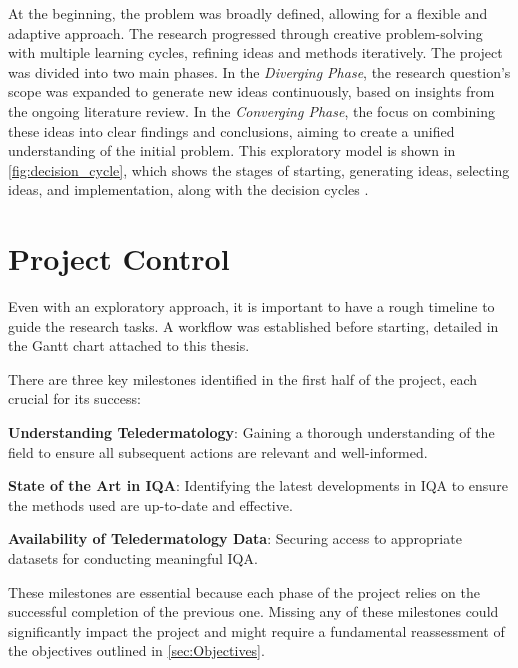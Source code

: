 \vspace{\baselineskip}
\noindent
At the beginning, the problem was broadly defined, allowing for a flexible and adaptive approach. The research progressed through creative problem-solving with multiple learning cycles, refining ideas and methods iteratively. The project was divided into two main phases. In the \textit{Diverging Phase}, the research question’s scope was expanded to generate new ideas continuously, based on insights from the ongoing literature review. In the \textit{Converging Phase}, the focus on combining these ideas into clear findings and conclusions, aiming to create a unified understanding of the initial problem. This exploratory model is shown in \autoref{fig:decision_cycle}, which shows the stages of starting, generating ideas, selecting ideas, and implementation, along with the decision cycles .

\section{Project Control}
\label{sec:ProjectMonitoring}
Even with an exploratory approach, it is important to have a rough timeline to guide the research tasks. A workflow was established before starting, detailed in the Gantt chart attached to this thesis. \par
\vspace{\baselineskip}
\noindent
There are three key milestones identified in the first half of the project, each crucial for its success: \par
\vspace{\baselineskip}
\noindent
\textbf{Understanding Teledermatology}: Gaining a thorough understanding of the field to ensure all subsequent actions are relevant and well-informed. \par
\vspace{\baselineskip}
\noindent
\textbf{State of the Art in IQA}: Identifying the latest developments in IQA to ensure the methods used are up-to-date and effective. \par
\vspace{\baselineskip}
\noindent
\textbf{Availability of Teledermatology Data}:  Securing access to appropriate datasets for conducting meaningful IQA. \par
\vspace{\baselineskip}
\noindent
These milestones are essential because each phase of the project relies on the successful completion of the previous one. Missing any of these milestones could significantly impact the project and might require a fundamental reassessment of the objectives outlined in \autoref{sec:Objectives}. \par

